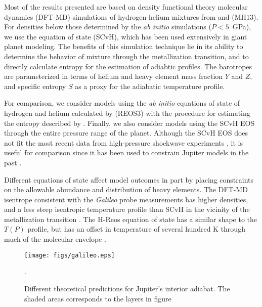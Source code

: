 Most of the results presented are based on  density functional theory molecular
dynamics (DFT-MD) simulations of hydrogen-helium mixtures from
\citet{militzer2013a} and \citet{militzer2013b} (MH13).  For densities below
those determined by the \textit{ab initio} simulations ($P<5$~GPa), we use the
\citet{saumon1995} equation of state (SCvH), which has been used extensively in
giant planet modeling. The benefits of this simulation technique lie in its
ability to determine the behavior of mixture through the metallization
transition, and to directly calculate entropy for the estimation of adiabtic
profiles. The barotropes are parameterized in
terms of helium and heavy element mass fraction $Y$ and $Z$, and specific
entropy $S$ as a proxy for the adiabatic temperature profile.

For comparison, we consider  models using the \textit{ab initio} equations of
state of hydrogen and helium calculated by \citet{becker2013}(REOS3) with the
procedure for estimating the entropy described by \citet{miguel2016}. Finally,
we also consider models using the SCvH EOS through the entire pressure range of
the planet.  Although the SCvH EOS does not fit the most recent data from
high-pressure shockwave experiments \citep{hubbard2016,miguel2016}, it is 
useful for comparison since it has been used to constrain Jupiter models
in the past \citep[e.g.][]{Saumon2004}.  

Different equations of state affect model outcomes in part by placing
constraints on the allowable abundance and distribution of heavy elements. The
DFT-MD isentrope consistent with the \textit{Galileo} probe measurements has
higher densities, and a less steep isentropic temperature profile than SCvH in
the vicinity of the metallization transition
\citep{militzer2013a,militzer2016}. The H-Reos equation of state has a similar
shape to the $T(P)$ profile, but has an offset in temperature of several
hundred K through much of the molecular envelope
\citep{Nettelmann2012,hubbard2016,miguel2016}. 

\begin{figure}[h]
  \begin{center}
    \noindent\texttt{[image: figs/galileo.eps]}
  \end{center}
  \caption{Different theoretical predictions for Jupiter's interior adiabat. The shaded areas corresponds to the layers
    in figure~\label{fig:galileo_match}}. 
  \label{fig:jup}
\end{figure}


